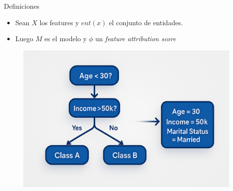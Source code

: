 \begin{frame}{Definiciones}
	\begin{itemize}
		\item Sean $X$ los features y $ent(x)$ el conjunto de entidades.
		\item Luego $M$ es el modelo y $\phi$ un \textit{feature attribution score}
	\end{itemize}
	\begin{figure}
		\centering
		\includegraphics[width=0.7\linewidth]{pic/img/XAI/modelAndEntityExample.png}
	\end{figure}
\end{frame}


